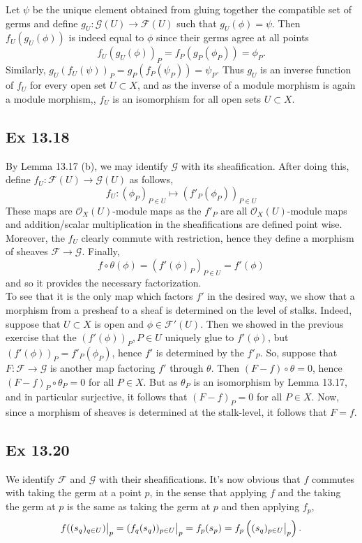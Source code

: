 \documentclass{article}
\newcommand\restr[2]{{%
  \left.\kern-\nulldelimiterspace %
  #1 %
  \vphantom{\big|} %
  \right|_{#2} %
  }}
\theoremstyle{definition}
\newcommand{\ox}{\mathcal{O}_X}
\begin{document}
Let $\psi$ be the unique element obtained from gluing together the compatible
set of germs and define $g_U : \mathcal{G}(U) \to \mathcal{F}(U)$ such that
$g_U(\phi) = \psi$. Then $f_U(g_U(\phi))$ is indeed equal to $\phi$ since their germs
agree at all points
\[
	f_U(g_U(\phi))_P 
	=
	f_P(g_P(\phi_P))
	=
	\phi_P.
\]
Similarly, $g_U(f_U(\psi))_P = g_P(f_P(\psi_P)) = \psi_P$. Thus $g_U$ is an
inverse function of $f_U$ for every open set $U \subset X$, and as the inverse
of a module morphism is again a module morphism,, $f_U$ is an isomorphism for
all open sets $U \subset X$.


\subsection*{Ex 13.18}

By Lemma 13.17 (b), we may identify $\mathcal{G}$ with its sheafification.
After doing this, define $f_U : \mathcal{F}(U) \to \mathcal{G}(U)$ as follows,
\[
	f_U : (\phi_P)_{P \in U} 
	\mapsto 
	(f'_P(\phi_P))_{P \in U} 
\] 
These maps are $\ox(U)$-module maps as the $f'_P$ are all $\ox(U)$-module maps
and addition/scalar multiplication in the sheafifications are defined point
wise. Moreover, the $f_U$ clearly commute with restriction, hence they define a
morphism of sheaves $\mathcal{F} \to \mathcal{G}$. Finally,
\[
	f \circ \theta (\phi)
	=
	(f'(\phi)_P)_{P \in U}
	=
	f'(\phi)
\] 
and so it provides the necessary factorization. \\

To see that it is the only map which factors $f'$ in the desired way, we show
that a morphism from a presheaf to a sheaf is determined on the level of
stalks. Indeed, suppose that $U \subset X$ is open and $\phi \in
\mathcal{F}'(U)$. Then we showed in the previous exercise that the
$(f'(\phi))_P, P \in U$ uniquely glue to $f'(\phi)$, but $(f'(\phi))_P =
f'_P(\phi_P)$, hence $f'$ is determined by the $f'_P$. So, suppose that $F :
\mathcal{F} \to \mathcal{G}$ is another map factoring $f'$ through $\theta$.
Then $(F - f) \circ \theta = 0$, hence $(F - f)_P \circ \theta_P = 0$ for all
$P \in X$. But as $\theta_P$ is an isomorphism by Lemma 13.17, and in
particular surjective, it follows that $(F - f)_P = 0$ for all $P \in X$. Now,
since a morphism of sheaves is determined at the stalk-level, it follows that
$F = f$.


\subsection*{Ex 13.20}
We identify $\mathcal{F}$ and $\mathcal{G}$ with their sheafifications. It's
now obvious that $f$ commutes with taking the germ at a point $p$, in the sense
that applying $f$ and the taking the germ at $p$ is the same as taking the germ
at $p$ and then applying $f_p$,
\[
	\restr{f((s_q)_{q \in U})}{p}
	=
	\restr{(f_q(s_q))_{p \in U}}{p}
	=
	f_p(s_p)
	=
	f_p\left(\restr{(s_q)_{p \in U}}{p}\right).
\] 
\end{document}
